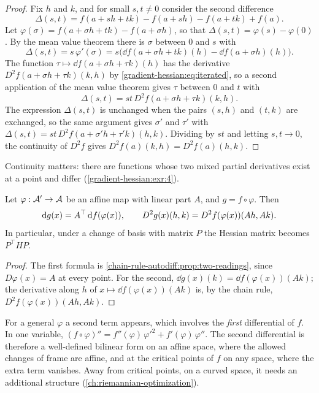 \begin{notechapter}
\begin{proof}
Fix $h$ and $k$, and for small $s, t\neq0$ consider the second difference
\[
  \Delta(s, t) = f(a + sh + tk) - f(a + sh) - f(a + tk) + f(a) .
\]
Let $\varphi(\sigma) = f(a + \sigma h + tk) - f(a + \sigma h)$, so that
$\Delta(s, t) = \varphi(s) - \varphi(0)$. By the mean value theorem there
is $\sigma$ between $0$ and $s$ with
\[
  \Delta(s, t) = s\,\varphi'(\sigma)
  = s\bigl(\dd f(a + \sigma h + tk)(h) - \dd f(a + \sigma h)(h)\bigr) .
\]
The function $\tau\mapsto\dd f(a + \sigma h + \tau k)(h)$ has the
derivative $D^2f(a + \sigma h + \tau k)(k, h)$ by
\eqref{gradient-hessian:eq:iterated}, so a second application of the mean
value theorem gives $\tau$ between $0$ and $t$ with
\[
  \Delta(s, t) = st\,D^2f(a + \sigma h + \tau k)(k, h) .
\]
The expression $\Delta(s, t)$ is unchanged when the pairs $(s, h)$ and
$(t, k)$ are exchanged, so the same argument gives $\sigma'$ and $\tau'$
with $\Delta(s, t) = st\,D^2f(a + \sigma'h + \tau'k)(h, k)$. Dividing by
$st$ and letting $s, t\to0$, the continuity of $D^2f$ gives
$D^2f(a)(k, h) = D^2f(a)(h, k)$.
\end{proof}

Continuity matters: there are functions whose two mixed partial
derivatives exist at a point and differ
(\cref{gradient-hessian:exr:4}).

\begin{proposition}
\label{gradient-hessian:prop:affine}
Let $\varphi:\mathcal{A}'\to\mathcal{A}$ be an affine map with linear part $A$, and
$g = f\circ\varphi$. Then
\[
  \mathrm{d} g(x) = A^{\top}\,\mathrm{d} f(\varphi(x)), \qquad
  D^2g(x)(h, k) = D^2f(\varphi(x))(Ah, Ak) .
\]
In particular, under a change of basis with matrix $P$ the Hessian matrix
becomes $P^\top HP$.
\end{proposition}

\begin{proof}
The first formula is \cref{chain-rule-autodiff:prop:two-readings}, since
$D\varphi(x) = A$ at every point. For the second,
$\dd g(x)(k) = \dd f(\varphi(x))(Ak)$; the derivative along $h$ of
$x\mapsto\dd f(\varphi(x))(Ak)$ is, by the chain rule,
$D^2f(\varphi(x))(Ah, Ak)$.
\end{proof}

\begin{remark}
\label{gradient-hessian:rem:nonlinear}
For a general $\varphi$ a second term appears, which involves the
\emph{first} differential of $f$. In one variable,
$(f\circ\varphi)'' = f''(\varphi)\,\varphi'^2 + f'(\varphi)\,\varphi''$.
The second differential is therefore a well-defined bilinear form on an
affine space, where the allowed changes of frame are affine, and at the
critical points of $f$ on any space, where the extra term vanishes. Away
from critical points, on a curved space, it needs an additional structure
(\cref{ch:riemannian-optimization}).
\end{remark}


\end{notechapter}
